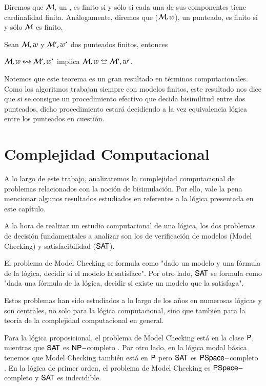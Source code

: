 Diremos que $\mathcal{M}$, un \ults, es finito si y sólo si cada una de sus componentes tiene cardinalidad finita. Análogamente, diremos que 
($\mathcal{M},w$), un \ults punteado, es finito si y sólo $\mathcal{M}$ es finito. 

\begin{teorema}\label{thm:finite-equivalence-implies-bisim}
    Sean $\mathcal{M},w$ y $\mathcal{M}',w'$ dos \ultss punteados finitos, entonces
    \begin{center}
        $\mathcal{M},w \mathrel{\leftrightsquigarrow} \mathcal{M}', w'$ implica $\model,w \bisim \model', w'$.
    \end{center}
\end{teorema}

Notemos que este teorema es un gran resultado en términos computacionales. Como los algoritmos trabajan siempre con modelos finitos, este resultado
nos dice que si se consigue un procedimiento efectivo que decida bisimilitud entre dos \ultss punteados, dicho procedimiento estará decidiendo a la vez
equivalencia lógica entre los \ultss punteados en cuestión.


\section{Complejidad Computacional}

A lo largo de este trabajo, analizaremos la complejidad computacional de problemas relacionados con la noción de bisimulación. 
Por ello, vale la pena mencionar algunos resultados estudiados en \cite{ArecesFSV25,SaraviaPHD} referentes a la lógica presentada en este 
capítulo. 

A la hora de realizar un estudio computacional de una lógica, los dos problemas de decisión fundamentales a analizar son los de 
verificación de modelos (Model Checking) y satisfacibilidad ($\rm\textsf{SAT}$).

El problema de Model Checking se formula como "dado un modelo y una fórmula de la lógica, decidir si el modelo la satisface". Por otro lado, 
$\rm\textsf{SAT}$ se formula como "dada una fórmula de la lógica, decidir si existe un modelo que la satisfaga". 

Estos problemas han sido estudiados a lo largo de los años en numerosas lógicas y son centrales, no solo para la lógica computacional, sino que 
también para la teoría de la complejidad computacional en general. 

Para la lógica proposicional, el problema de Model Checking está en la clase $\rm\textsf{P}$, mientras que $\rm\textsf{SAT}$ es $\rm\textsf{NP}-$completo 
\cite[Capítulo 2, Sección 3]{Goldreich_2008}. Por otro lado, en la lógica modal básica tenemos que Model Checking también 
está en $\rm\textsf{P}$ pero $\rm\textsf{SAT}$ es ${\rm\textsf{PSpace}}-$completo \cite[Capítulo 4]{HandbookModalLogic}. En la lógica de primer orden, el problema de 
Model Checking es ${\rm\textsf{PSpace}}-$completo \cite[Capítulo 5, Sección 4]{Goldreich_2008} y $\rm\textsf{SAT}$ es indecidible. 

